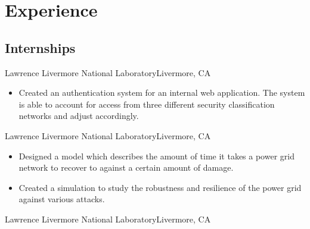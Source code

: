 \documentclass[12pt,a4paper,roman]{moderncv}        %
\begin{document}

\vspace{2pt}


\vspace{2pt}


\section{Experience}

\subsection{Internships}

{Lawrence Livermore National Laboratory}{Livermore, CA}{}{}

\begin{itemize}
	\item Created an authentication system for an internal web application. The system is able to account for access from three different security classification networks and adjust accordingly. 
\end{itemize}

\vspace{5pt}

{Lawrence Livermore National Laboratory}{Livermore, CA}{}{}

\begin{itemize}
    \item Designed a model which describes the amount of time it takes a power grid network to recover to against a certain amount of damage.

	\item Created a simulation to study the robustness and resilience of the power grid against various attacks.
\end{itemize}

\vspace{5pt}

{Lawrence Livermore National Laboratory}{Livermore, CA}{}{}
\end{document}
